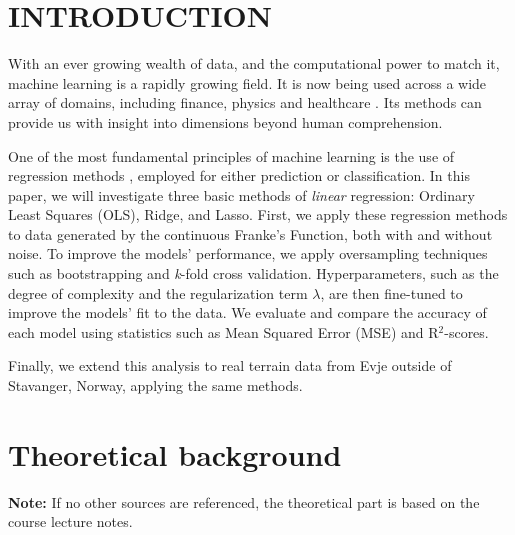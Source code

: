 \documentclass{article}
\begin{document}
\begin{multicols}{2}
\vspace{0pt}
\section*{INTRODUCTION} 
With an ever growing wealth of data, and the computational power to match it, machine learning is a rapidly growing field. It is now being used across a wide array of domains, including finance, physics and healthcare \cite{sarker_machine_2021}. Its methods can provide us with insight into dimensions beyond human comprehension.

One of the most fundamental principles of machine learning is the use of regression methods \cite{hastie_elements_2009}, employed for either prediction or classification. In this paper, we will investigate three basic methods of \textit{linear} regression: Ordinary Least Squares (OLS), Ridge, and Lasso. First, we apply these regression methods to data generated by the continuous Franke’s Function\cite{franke_critical_1975}, both with and without noise. To improve the models’ performance, we apply oversampling techniques such as bootstrapping and \textit{k}-fold cross validation. Hyperparameters, such as the degree of complexity and the regularization term $\lambda$, are then fine-tuned to improve the models’ fit to the data. We evaluate and compare the accuracy of each model using statistics such as Mean Squared Error (MSE) and R$^2$-scores.

Finally, we extend this analysis to real terrain data from Evje outside of Stavanger, Norway, applying the same methods.


\section*{Theoretical background}
\textbf{Note:} If no other sources are referenced, the theoretical part is based on the course lecture notes. \cite{hjorth-jensen_applied_2021}


\end{multicols}
\end{document}
